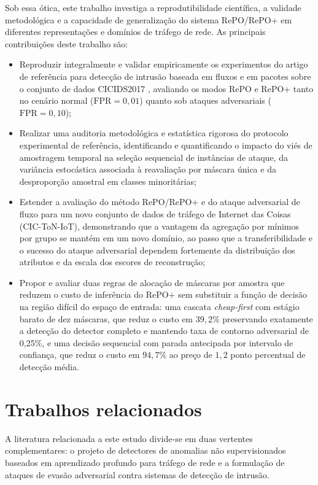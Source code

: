 \documentclass[conference]{IEEEtran}
\begin{document}
Sob essa ótica, este trabalho investiga a reprodutibilidade científica, a validade metodológica e a capacidade de generalização do sistema RePO/RePO+ em diferentes representações e domínios de tráfego de rede.
As principais contribuições deste trabalho são:

\begin{itemize}
    \item Reproduzir integralmente e validar empiricamente os experimentos do artigo de referência \cite{hashemi2020} para detecção de intrusão baseada em fluxos e em pacotes sobre o conjunto de dados CICIDS2017 \cite{sharafaldin2018}, avaliando os modos RePO e RePO+ tanto no cenário normal ($\text{FPR} = 0{,}01$) quanto sob ataques adversariais ($\text{FPR} = 0{,}10$);
    \item Realizar uma auditoria metodológica e estatística rigorosa do protocolo experimental de referência, identificando e quantificando o impacto do viés de amostragem temporal na seleção sequencial de instâncias de ataque, da variância estocástica associada à reavaliação por máscara única e da desproporção amostral em classes minoritárias;
    \item Estender a avaliação do método RePO/RePO+ e do ataque adversarial de fluxo para um novo conjunto de dados de tráfego de Internet das Coisas (CIC-ToN-IoT), demonstrando que a vantagem da agregação por mínimos por grupo se mantém em um novo domínio, ao passo que a transferibilidade e o sucesso do ataque adversarial dependem fortemente da distribuição dos atributos e da escala dos escores de reconstrução;
    \item Propor e avaliar duas regras de alocação de máscaras por amostra que reduzem o custo de inferência do RePO+ sem substituir a função de decisão na região difícil do espaço de entrada: uma cascata \textit{cheap-first} com estágio barato de dez máscaras, que reduz o custo em $39{,}2\%$ preservando exatamente a detecção do detector completo e mantendo taxa de contorno adversarial de 0,25\%, e uma decisão sequencial com parada antecipada por intervalo de confiança, que reduz o custo em $94{,}7\%$ ao preço de $1{,}2$ ponto percentual de detecção média.
\end{itemize}

\section{Trabalhos relacionados}

A literatura relacionada a este estudo divide-se em duas vertentes complementares: o projeto de detectores de anomalias não supervisionados baseados em aprendizado profundo para tráfego de rede e a formulação de ataques de evasão adversarial contra sistemas de detecção de intrusão.
\end{document}
